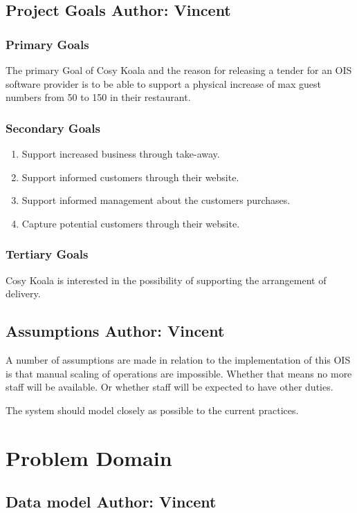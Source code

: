 \documentclass{article}
\begin{document}
\subsection{Project Goals \normalsize\textbf{Author: Vincent}}
\subsubsection{Primary Goals}
The primary Goal of Cosy Koala and the reason for releasing a tender for an OIS software provider is to be able to support a physical increase of max guest numbers from 50 to 150 in their restaurant.
\subsubsection{Secondary Goals}
\begin{enumerate}
    \item Support increased business through take-away.
    \item Support informed customers through their website.
    \item Support informed management about the customers purchases.
    \item Capture potential customers through their website.
\end{enumerate}
\subsubsection{Tertiary Goals}
Cosy Koala is interested in the possibility of supporting the arrangement of delivery.

\subsection{Assumptions \normalsize\textbf{Author: Vincent}}
A number of assumptions are made in relation to the implementation of this OIS is that manual scaling of operations are impossible. Whether that means no more staff will be available. Or whether staff will be expected to have other duties.

The system should model closely as possible to the current practices.


\clearpage

\section{Problem Domain}

\subsection{Data model \normalsize\textbf{Author: Vincent}}
\end{document}
